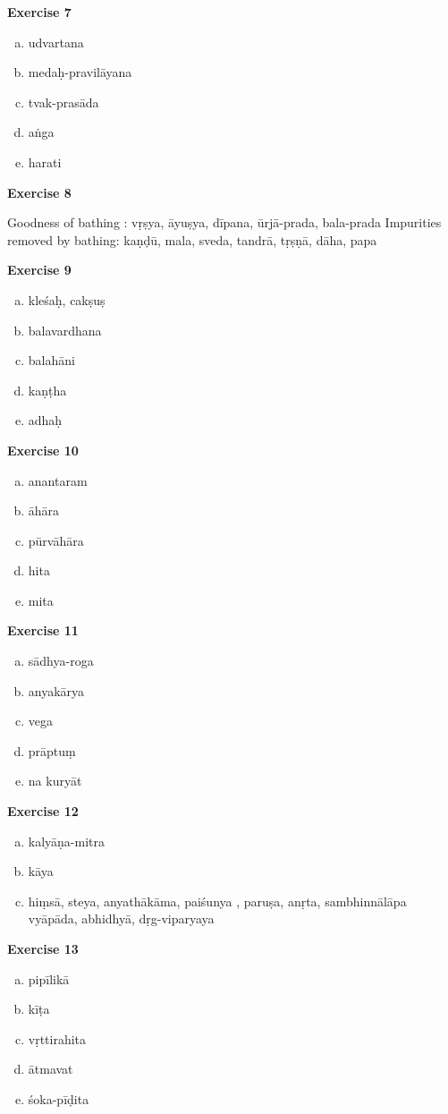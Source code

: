 \begin{multicols}{2}
\textbf{Exercise 7}
\begin{enumerate}[a.]
\item udvartana
\item medaḥ-pravilāyana
\item tvak-prasāda
\item aṅga
\item harati
\end{enumerate}

\textbf{Exercise 8}

\vspace{.2cm}
Goodness of bathing : vṛṣya, āyuṣya, dīpana, ūrjā-prada, bala-prada Impurities removed by bathing: kaṇḍū, mala, sveda, tandrā, tṛṣṇā, dāha, papa
\newpage

\textbf{Exercise 9}
\begin{enumerate}[a.]
\item kleśaḥ, cakṣuṣ 
\item balavardhana 
\item balahāni
\item kaṇṭha
\item adhaḥ
\end{enumerate}

\textbf{Exercise 10}
\begin{enumerate}[a.]
\item anantaram
\item āhāra
\item pūrvāhāra 
\item hita
\item mita
\end{enumerate}

\textbf{Exercise 11}
\begin{enumerate}[a.]
\item sādhya-roga
\item anyakārya
\item vega 
\item prāptuṃ
\item na kuryāt
\end{enumerate}

\textbf{Exercise 12}
\begin{enumerate}[a.]
\item kalyāṇa-mitra 
\item kāya 
\item hiṃsā, steya, anyathākāma, paiśunya , paruṣa, anṛta, sambhinnālāpa vyāpāda, abhidhyā, dṛg-viparyaya
\end{enumerate}

\textbf{Exercise 13}
\vspace{-.2cm}
\begin{enumerate}[a.]
\item pipīlikā 
\item kīṭa
\item vṛttirahita
\item ātmavat
\item śoka-pīḍita
\end{enumerate}


\end{multicols}

